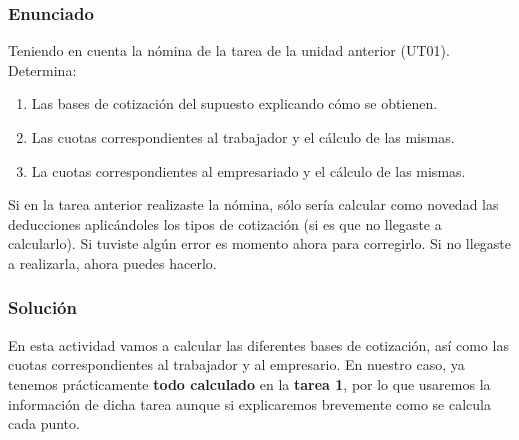 \subsubsection{Enunciado}

Teniendo en cuenta la nómina de la tarea de la unidad anterior (UT01). Determina:

\begin{enumerate}[label=\alph*)]
    \item Las bases de cotización del supuesto explicando cómo se obtienen.
    \item Las cuotas correspondientes al trabajador y el cálculo de las mismas.
    \item La cuotas correspondientes al empresariado y el cálculo de las mismas.
\end{enumerate}

Si en la tarea anterior realizaste la nómina, sólo sería calcular como novedad las deducciones aplicándoles los tipos de cotización (si es que no llegaste a calcularlo). Si tuviste algún error es momento ahora para corregirlo. Si no llegaste a realizarla, ahora puedes hacerlo.

\subsubsection{Solución}
En esta actividad vamos a calcular las diferentes bases de cotización, así como las cuotas correspondientes al trabajador y al empresario. En nuestro caso, ya tenemos prácticamente \textbf{todo calculado} en la \textbf{tarea 1}, por lo que usaremos la información de dicha tarea aunque si explicaremos brevemente como se calcula cada punto.

